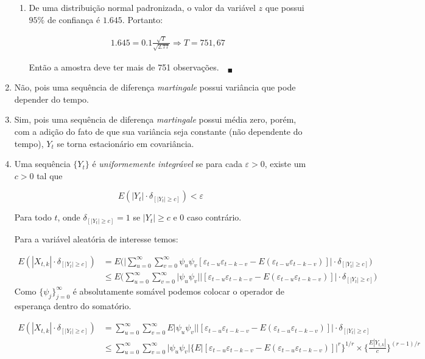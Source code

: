 \begin{enumerate}
\begin{enumerate}
		\item  %
		
		De uma distribuição normal padronizada, o valor da variável $z$ que possui $95\%$ de confiança é $1.645$. Portanto:
		
		\begin{align*}
			1.645=0.1\frac{\sqrt{T}}{\sqrt{2.77}} \Rightarrow T=751,67
		\end{align*}
	
		Então a amostra deve ter mais de 751 observações.$\quad_{\blacksquare}$
	
	\end{enumerate}

		\item[\fbox{7.3}]
		
		Não, pois uma sequência de diferença \emph{martingale} possui variância que pode depender do tempo.
		
		\item[\fbox{7.4}]
		Sim, pois uma sequência de diferença \emph{martingale} possui média zero, porém, com a adição do fato de que sua variância seja constante (não dependente do tempo), $Y_t$ se torna estacionário em covariância.
		
		\item[\fbox{7.5}]
		Uma sequência $\{Y_t\}$ é \emph{uniformemente integrável} se para cada $\varepsilon>0$, existe um $c>0$ tal que 
		
		$$E(|Y_t|\cdot\delta_{[|Y_t|\geq c]})<\varepsilon$$
		
		Para todo $t$, onde $\delta_{[|Y_t|\geq c]}=1$ se $|Y_t|\geq c$ e $0$ caso contrário.
				
		Para a variável aleatória de interesse temos:
		
		\begin{align*}
			E(|X_{t,k}|\cdot\delta_{[|Y_t|\geq c]})&=E\bigg(\bigg|\sum\limits_{u=0}^{\infty}\sum\limits_{v=0}^{\infty}\psi_u\psi_v[\varepsilon_{t-u}\varepsilon_{t-k-v}-E(\varepsilon_{t-u}\varepsilon_{t-k-v})]\bigg|\cdot\delta_{[|Y_t|\geq c]}\bigg)\\
			&\leq E\bigg(\sum\limits_{u=0}^{\infty}\sum\limits_{v=0}^{\infty}\bigg|\psi_u\psi_v\bigg|\bigg|[\varepsilon_{t-u}\varepsilon_{t-k-v}-E(\varepsilon_{t-u}\varepsilon_{t-k-v})]\bigg|\cdot\delta_{[|Y_t|\geq c]}\bigg)
		\end{align*}
		Como $\{\psi_j\}_{j=0}^{\infty}$ é absolutamente somável podemos colocar o operador de esperança dentro do somatório.
		
		\begin{align*}
			E(|X_{t,k}|\cdot\delta_{[|Y_t|\geq c]})&= \sum\limits_{u=0}^{\infty}\sum\limits_{v=0}^{\infty}E\bigg|\psi_u\psi_v\bigg|\bigg|[\varepsilon_{t-u}\varepsilon_{t-k-v}-E(\varepsilon_{t-u}\varepsilon_{t-k-v})]\bigg|\cdot\delta_{[|Y_t|\geq c]}\\
			&\leq\sum\limits_{u=0}^{\infty}\sum\limits_{v=0}^{\infty}\bigg|\psi_u\psi_v\bigg|\bigg\{E\bigg|[\varepsilon_{t-u}\varepsilon_{t-k-v}-E(\varepsilon_{t-u}\varepsilon_{t-k-v})]\bigg|^{r}\bigg\}^{1/r}\times \bigg\{\frac{E|Y_{t,k}|}{c}\bigg\}^{(r-1)/r}
		\end{align*}
	

\end{enumerate}
